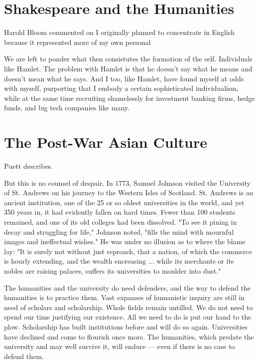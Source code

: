 \documentclass[12pt,letterpaper]{article}
\begin{document}
\section{Shakespeare and the Humanities}
Harold Bloom commented on 
I originally planned to concentrate in English because it represented more of my own personal 

We are left to ponder what then consistutes the formation of the self.  Individuals like Hamlet.  The problem with Hamlet is that he doesn't say what he means and doesn't mean what he says.  And I too, like Hamlet, have found myself at odds with myself, purporting that I embody a certain sophisticated individualism, while at the same time recruiting shamelessly for investment banking firms, hedge funds, and big tech companies like many.


\section{The Post-War Asian Culture}
Puett describes.  

But this is no counsel of despair. In 1773, Samuel Johnson visited the University of St. Andrews on his journey to the Western Isles of Scotland. St. Andrews is an ancient institution, one of the 25 or so oldest universities in the world, and yet 350 years in, it had evidently fallen on hard times. Fewer than 100 students remained, and one of its old colleges had been dissolved. "To see it pining in decay and struggling for life," Johnson noted, "fills the mind with mournful images and ineffectual wishes." He was under no illusion as to where the blame lay: "It is surely not without just reproach, that a nation, of which the commerce is hourly extending, and the wealth encreasing ... while its merchants or its nobles are raising palaces, suffers its universities to moulder into dust."

The humanities and the university do need defenders, and the way to defend the humanities is to practice them. Vast expanses of humanistic inquiry are still in need of scholars and scholarship. Whole fields remain untilled. We do not need to spend our time justifying our existence. All we need to do is put our hand to the plow. Scholarship has built institutions before and will do so again. Universities have declined and come to flourish once more. The humanities, which predate the university and may well survive it, will endure — even if there is no case to defend them.
\end{document}

